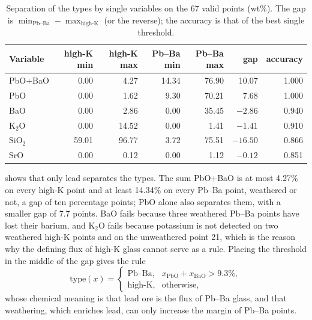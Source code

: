 \documentclass[11pt,a4paper]{article}
\newcommand{\ox}[1]{\ensuremath{\mathrm{#1}}}
\begin{document}
\begin{table}[ht]
\centering
\caption{Separation of the types by single variables on the 67 valid points (wt\%). The gap is $\min_{\text{Pb--Ba}}-\max_{\text{high-K}}$ (or the reverse); the accuracy is that of the best single threshold.}\label{tab:sep}
\small
\begin{tabular}{lrrrrrr}
\toprule
Variable & high-K min & high-K max & Pb--Ba min & Pb--Ba max & gap & accuracy \\
\midrule
PbO+BaO & 0.00 & 4.27 & 14.34 & 76.90 & 10.07 & 1.000 \\
PbO & 0.00 & 1.62 & 9.30 & 70.21 & 7.68 & 1.000 \\
BaO & 0.00 & 2.86 & 0.00 & 35.45 & $-2.86$ & 0.940 \\
\ox{K_2O} & 0.00 & 14.52 & 0.00 & 1.41 & $-1.41$ & 0.910 \\
\ox{SiO_2} & 59.01 & 96.77 & 3.72 & 75.51 & $-16.50$ & 0.866 \\
SrO & 0.00 & 0.12 & 0.00 & 1.12 & $-0.12$ & 0.851 \\
\bottomrule
\end{tabular}
\end{table}

 shows that only lead separates the types.
The sum PbO+BaO is at most 4.27\% on every high-K point and at least 14.34\% on every Pb--Ba point, weathered or not, a gap of ten percentage points; PbO alone also separates them, with a smaller gap of 7.7 points.
BaO fails because three weathered Pb--Ba points have lost their barium, and \ox{K_2O} fails because potassium is not detected on two weathered high-K points and on the unweathered point 21, which is the reason why the defining flux of high-K glass cannot serve as a rule.
Placing the threshold in the middle of the gap gives the rule
\begin{equation}\label{eq:rule}
\text{type}(x)=\begin{cases}\text{Pb--Ba}, & x_{\mathrm{PbO}}+x_{\mathrm{BaO}} > 9.3\%,\\ \text{high-K}, & \text{otherwise},\end{cases}
\end{equation}
whose chemical meaning is that lead ore is the flux of Pb--Ba glass, and that weathering, which enriches lead, can only increase the margin of Pb--Ba points.
\end{document}
